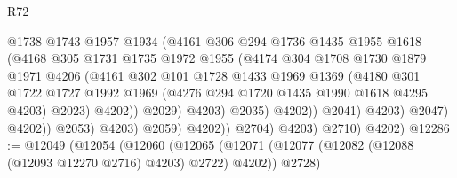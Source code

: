 \begin{lexlean}{R72}
\begin{coremodule}
                                      @1738
                                      @1743
                                      @1957
                                      @1934
                                      (@4161
                                        @306
                                        @294
                                        @1736
                                        @1435
                                        @1955
                                        @1618
                                        (@4168
                                          @305
                                          @1731
                                          @1735
                                          @1972
                                          @1955
                                          (@4174
                                            @304
                                            @1708
                                            @1730
                                            @1879
                                            @1971
                                            @4206
                                            (@4161
                                              @302
                                              @101
                                              @1728
                                              @1433
                                              @1969
                                              @1369
                                              (@4180
                                                @301
                                                @1722
                                                @1727
                                                @1992
                                                @1969
                                                (@4276 @294 @1720 @1435 @1990 @1618 @4295 @4203)
                                                @2023)
                                              @4202))
                                          @2029)
                                        @4203)
                                      @2035)
                                    @4202))
                                @2041)
                              @4203)
                            @2047)
                          @4202))
                      @2053)
                    @4203)
                  @2059)
                @4202))
            @2704)
          @4203)
        @2710)
      @4202)
@12286 := @12049
    (@12054
      (@12060
        (@12065 (@12071 (@12077 (@12082 (@12088 (@12093 @12270 @2716) @4203) @2722) @4202)) @2728)

\end{coremodule}
\end{lexlean}
